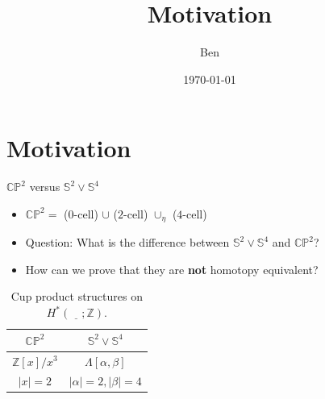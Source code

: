 \documentclass{beamer}
\title{Motivation}
\author{Ben}
\institute{University of Bonn}
\date{\today}
\newcommand{\sphere}[1]{\mathbb{S}^{#1}}
\newcommand{\CP}[1]{\mathbb{CP}^{#1}}
\newcommand{\Z}{\mathbb{Z}}
\begin{document}


\section{Motivation}

\begin{frame}{$\CP{2}$ versus $\sphere{2} \vee \sphere{4}$}
	
	\begin{itemize}
	  \item $\CP{2} = $ ($0$-cell) $\cup$ ($2$-cell) $\cup_{\eta}$ ($4$-cell)
	  
	  \pause
	  
	  \item Question: What is the difference between $\sphere{2} \vee \sphere{4}$
	  and $\CP{2}$?
	  \item How can we prove that they are \textbf{not} homotopy equivalent?
	\end{itemize}
	
	\pause

	\begin{table}
		\centering
		\begin{tabular}{c|c}
			$\CP{2}$ & $\sphere{2} \vee \sphere{4}$ \\\hline
			$\Z[x]/x^{3}$ & $\Lambda[\alpha, \beta]$ \\
			$|x| = 2$ & $|\alpha| = 2, |\beta| = 4$
		\end{tabular}
		\caption{\label{tab:cup_producs} Cup product structures on $H^{*}(\underline{\quad}; \Z)$.}
	\end{table}

\end{frame}
\end{document}
